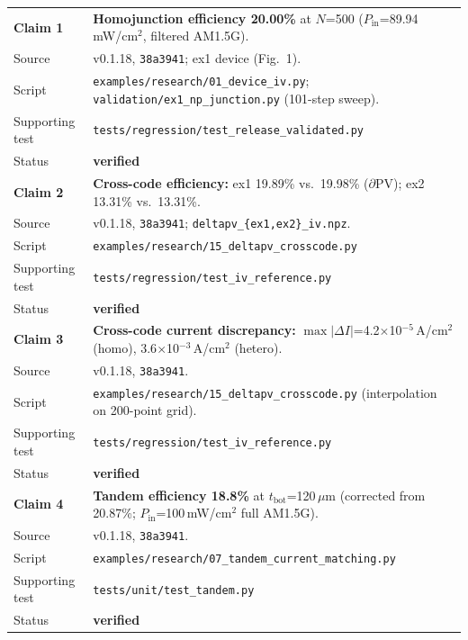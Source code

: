 \documentclass[11pt,a4paper]{article}
\begin{document}
\begin{table}[tbp]
\begin{tabularx}{\linewidth}{@{}Z Y@{}}
\textbf{Claim 1} &
\textbf{Homojunction efficiency 20.00\%} at $N$=500
  ($P_\mathrm{in}$=89.94\,mW/cm$^2$, filtered AM1.5G). \\
Source & v0.1.18, \texttt{38a3941}; ex1 device (Fig.~1). \\
Script & \texttt{examples/research/01\_device\_iv.py};
  \texttt{validation/ex1\_np\_junction.py} (101-step sweep). \\
Supporting test & \texttt{tests/regression/test\_release\_validated.py} \\
Status & \textcolor{green!50!black}{\textbf{verified}} \\[4pt]

\textbf{Claim 2} &
\textbf{Cross-code efficiency:} ex1 19.89\% vs.\ 19.98\% ($\partial$PV);
  ex2 13.31\% vs.\ 13.31\%. \\
Source & v0.1.18, \texttt{38a3941}; \texttt{deltapv\_\{ex1,ex2\}\_iv.npz}. \\
Script & \texttt{examples/research/15\_deltapv\_crosscode.py} \\
Supporting test & \texttt{tests/regression/test\_iv\_reference.py} \\
Status & \textcolor{green!50!black}{\textbf{verified}} \\[4pt]

\textbf{Claim 3} &
\textbf{Cross-code current discrepancy:}
  $\max|\Delta I|$=4.2$\times$10$^{-5}$\,A/cm$^2$ (homo),
  3.6$\times$10$^{-3}$\,A/cm$^2$ (hetero). \\
Source & v0.1.18, \texttt{38a3941}. \\
Script & \texttt{examples/research/15\_deltapv\_crosscode.py}
  (interpolation on 200-point grid). \\
Supporting test & \texttt{tests/regression/test\_iv\_reference.py} \\
Status & \textcolor{green!50!black}{\textbf{verified}} \\[4pt]

\textbf{Claim 4} &
\textbf{Tandem efficiency 18.8\%} at $t_\mathrm{bot}$=120\,$\mu$m
  (corrected from 20.87\%; $P_\mathrm{in}$=100\,mW/cm$^2$ full AM1.5G). \\
Source & v0.1.18, \texttt{38a3941}. \\
Script & \texttt{examples/research/07\_tandem\_current\_matching.py} \\
Supporting test & \texttt{tests/unit/test\_tandem.py} \\
Status & \textcolor{green!50!black}{\textbf{verified}} \\[4pt]


\end{tabularx}
\end{table}
\end{document}
